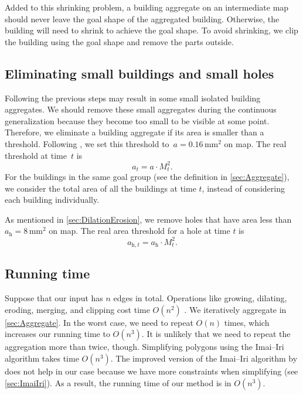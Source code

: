 Added to this shrinking problem, 
a building aggregate on an intermediate map should never leave
the goal shape of the aggregated building. 
Otherwise, the building will need to shrink 
to achieve the goal shape.
To avoid shrinking, 
we clip the building using the goal shape 
and remove the parts outside.


\subsection{Eliminating small buildings and small holes}
\label{sec:Eliminate}
Following the previous steps may result in 
some small isolated building aggregates.
We should remove these small aggregates during
the continuous generalization 
because they become too small to be visible at some point.
Therefore, we eliminate a building aggregate if its area is 
smaller than a threshold.
Following \citet{Stoter2009,Chaudhry2008}, 
we set this threshold to~$a=0.16\,\mathrm{mm}^2$ on map.
The real threshold at time~$t$ is
\[
a_t=a\cdot M_t^2.
\]
For the buildings in the same goal group 
(see the definition in \sect\ref{sec:Aggregate}),
we consider the total area of all the buildings at time $t$, 
instead of considering each building individually.

As mentioned in \sect\ref{sec:DilationErosion}, 
we remove holes that have area less than 
$a_\mathrm{h} = 8\,\mathrm{mm}^2$ on map.
The real area threshold for a hole at time $t$ is
\[
a_{\mathrm{h},t}=a_\mathrm{h}\cdot M_t^2.
\]

\subsection{Running time}
Suppose that our input has $n$ edges in total.
Operations like growing, dilating, 
eroding, merging, and clipping 
cost time $O(n^2)$ \citep{Greiner1998Clipping,Palfrader2015}.
We iteratively aggregate in \sect\ref{sec:Aggregate}.
In the worst case, we need to repeat $O(n)$ times,
which increases our running time to $O(n^3)$.
It is unlikely that we need to repeat the aggregation more than 
twice, though.
Simplifying polygons using the Imai--Iri algorithm takes time
$O(n^3)$.
The improved version of the Imai--Iri algorithm by 
\citet{Chan1996} does not help in our case
because we have more constraints when simplifying
(see \sect\ref{sec:ImaiIri}).
As a result, the running time of our method is in $O(n^3)$.


